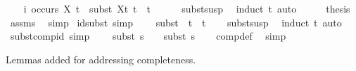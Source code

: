 \begin{isabellebody}
{\isacharminus}{\kern0pt}\isanewline
\ \ \isamarkupfalse%
\ i{\isacharcolon}{\kern0pt}\ {\isachardoublequoteopen}{\isasymnot}{\isacharparenleft}{\kern0pt}occurs\ X\ t{\isacharparenright}{\kern0pt}\ {\isasymlongrightarrow}\ subst\ {\isacharbrackleft}{\kern0pt}{\isacharparenleft}{\kern0pt}X{\isacharcomma}{\kern0pt}t{}{\isacharparenright}{\kern0pt}{\isacharbrackright}{\kern0pt}\ t\ {\isacharequal}{\kern0pt}\ t{\isachardoublequoteclose}\isanewline
\ \ \ \ \isamarkupfalse%
\ subst{\isacharunderscore}{\kern0pt}susp\ \isamarkupfalse%
\ {\isacharparenleft}{\kern0pt}induct\ t{\isacharparenright}{\kern0pt}\ auto\isanewline
\ \ \isamarkupfalse%
\ \isamarkupfalse%
\ {\isacharquery}{\kern0pt}thesis\ \isamarkupfalse%
\ assms\ \isamarkupfalse%
\ simp\isanewline
{}\isamarkupfalse%
%
\endisatagproof
{\isafoldproof}%
%
\isadelimproof
\isanewline
%
\endisadelimproof
\isanewline
{}\isamarkupfalse%
\ id{\isacharunderscore}{\kern0pt}subst\ {\isacharbrackleft}{\kern0pt}simp{\isacharbrackright}{\kern0pt}{\isacharcolon}{\kern0pt}\ \isanewline
\ \ \ {\isachardoublequoteopen}subst\ {\isacharbrackleft}{\kern0pt}{\isacharbrackright}{\kern0pt}\ t\ {\isacharequal}{\kern0pt}\ t{\isachardoublequoteclose}\isanewline
%
\isadelimproof
\ \ %
\endisadelimproof
%
\isatagproof
{}\isamarkupfalse%
\ subst{\isacharunderscore}{\kern0pt}susp\ \isamarkupfalse%
\ {\isacharparenleft}{\kern0pt}induct\ t{\isacharparenright}{\kern0pt}\ auto%
\endisatagproof
{\isafoldproof}%
%
\isadelimproof
\isanewline
%
\endisadelimproof
\isanewline
{}\isamarkupfalse%
\ subst{\isacharunderscore}{\kern0pt}comp{\isacharunderscore}{\kern0pt}id\ {\isacharbrackleft}{\kern0pt}simp{\isacharbrackright}{\kern0pt}{\isacharcolon}{\kern0pt}\ \isanewline
\ \ \ {\isachardoublequoteopen}subst\ {\isacharparenleft}{\kern0pt}s\ {\isasymbullet}\ {\isacharbrackleft}{\kern0pt}{\isacharbrackright}{\kern0pt}{\isacharparenright}{\kern0pt}\ {\isacharequal}{\kern0pt}\ subst\ s{\isachardoublequoteclose}\isanewline
%
\isadelimproof
\ \ %
\endisadelimproof
%
\isatagproof
{}\isamarkupfalse%
\ comp{\isacharunderscore}{\kern0pt}def\ \isamarkupfalse%
\ simp%
\endisatagproof
{\isafoldproof}%
%
\isadelimproof
%
\endisadelimproof
%
\begin{isamarkuptext}%
Lemmas added for addressing completeness.%
\end{isamarkuptext}\isamarkuptrue%

\end{isabellebody}

